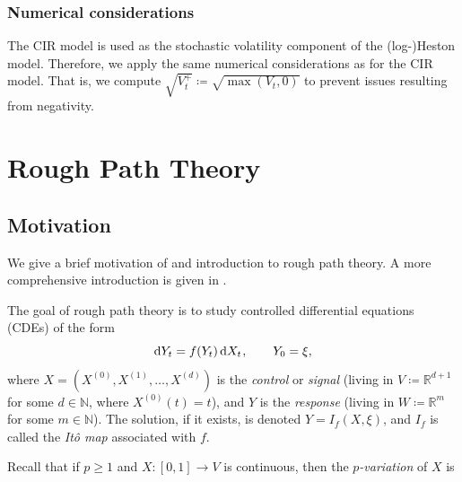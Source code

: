 \documentclass[11pt, letterpaper]{article}
\theoremstyle{definition}
\theoremstyle{remark}
\newcommand{\R}{\mathbb{R}}
\newcommand{\m}{\hspace{0.25mm}}
\newcommand{\N}{\mathbb{N}}
\newcommand{\diff}{\mathop{}\!\mathrm{d}}
\begin{document}
\begin{appendices}
\subsubsection*{Numerical considerations}

The CIR model is used as the stochastic volatility component of the (log-)Heston model. Therefore, we apply the same numerical considerations as for the CIR model.
That is, we compute $\sqrt{V_t^+} \coloneqq \sqrt{\max{(V_t, 0)}}$ to prevent issues resulting from negativity.

\clearpage
\section{Rough Path Theory}\label{app:roughpaths}

\subsection{Motivation}\label{sec:rp:motivation}
We give a brief motivation of and introduction to rough path theory. A more comprehensive introduction is given in \cite{terrystflour}.

The goal of rough path theory is to study controlled differential equations (CDEs) of the form 
\begin{equation}\label{eq:CDE}
    \diff Y_t = f(Y_t) \diff X_t\m,\qquad Y_0 = \xi,
\end{equation}
where $X= (X^{(0)},X^{(1)},\ldots,X^{(d)})$ is the \emph{control} or \emph{signal} (living in $V \coloneqq \R^{d+1}$ for some $d\in \N$, where $X^{(0)}(t) = t$), and $Y$ is the \emph{response} (living in $W \coloneqq \R^m$ for some $m\in \N$). The solution, if it exists, is denoted $Y = I_f(X,\xi)$, and $I_f$ is called the \emph{It{\^o} map} associated with $f$.

Recall that if $p \ge 1$ and $X\colon [0,1] \to V$ is continuous, then the \emph{$p$-variation} of $X$ is


\end{appendices}
\end{document}
